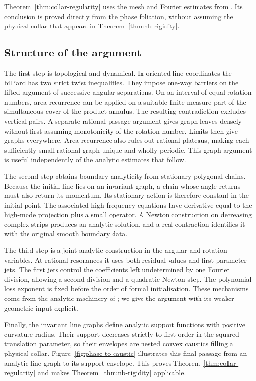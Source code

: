 Theorem~\ref{thm:collar-regularity} uses the mesh and Fourier estimates
from \cite{NB}. Its conclusion is proved directly from the phase
foliation, without assuming the physical collar that appears in
Theorem~\ref{thm:nb-rigidity}.

\subsection{Structure of the argument}

The first step is topological and dynamical. In oriented-line
coordinates the billiard has two strict twist inequalities. They impose
one-way barriers on the lifted argument of successive angular
separations. On an interval of equal rotation numbers, area recurrence
can be applied on a suitable finite-measure part of the simultaneous
cover of the product annulus. The resulting contradiction excludes
vertical pairs. A separate rational-passage argument gives graph leaves
densely without first assuming monotonicity of the rotation number.
Limits then give graphs everywhere. Area recurrence also rules out
rational plateaus, making each sufficiently small rational graph unique
and wholly periodic. This graph argument is useful independently of
the analytic estimates that follow.

The second step obtains boundary analyticity from stationary polygonal
chains. Because the initial line lies on an invariant graph, a chain
whose angle returns must also return its momentum. Its stationary action
is therefore constant in the initial point. The associated
high-frequency equations have derivative equal to the high-mode
projection plus a small operator. A Newton construction on decreasing
complex strips produces an analytic solution, and a real contraction
identifies it with the original smooth boundary data.

The third step is a joint analytic construction in the angular and
rotation variables. At rational resonances it uses both residual values
and first parameter jets. The first jets control the coefficients left
undetermined by one Fourier division, allowing a second division and a
quadratic Newton step. The polynomial loss exponent is fixed before the
order of formal initialization. These mechanisms come from the analytic
machinery of \cite{NB}; we give the argument with its weaker geometric
input explicit.

Finally, the invariant line graphs define analytic support functions
with positive curvature radius. Their support decreases strictly to
first order in the squared translation parameter, so their envelopes
are nested convex caustics filling a physical collar.
Figure~\ref{fig:phase-to-caustic} illustrates this final passage from
an analytic line graph to its support envelope.
This proves Theorem~\ref{thm:collar-regularity} and makes
Theorem~\ref{thm:nb-rigidity} applicable.

